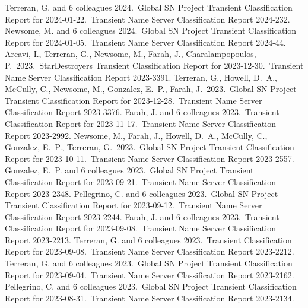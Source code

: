 \documentclass[margin,line]{res}
\begin{document}
\begin{resume}
 Terreran, G. and 6 colleagues 2024.\ Global SN Project Transient Classification Report for 2024-01-22.\ Transient Name Server Classification Report 2024-232.
 Newsome, M. and 6 colleagues 2024.\ Global SN Project Transient Classification Report for 2024-01-05.\ Transient Name Server Classification Report 2024-44.
 Arcavi, I., Terreran, G., Newsome, M., Farah, J., Charalampopoulos, P.\ 2023.\ StarDestroyers Transient Classification Report for 2023-12-30.\ Transient Name Server Classification Report 2023-3391.
 Terreran, G., Howell, D.~A., McCully, C., Newsome, M., Gonzalez, E.~P., Farah, J.\ 2023.\ Global SN Project Transient Classification Report for 2023-12-28.\ Transient Name Server Classification Report 2023-3376.
 Farah, J. and 6 colleagues 2023.\ Transient Classification Report for 2023-11-17.\ Transient Name Server Classification Report 2023-2992.
 Newsome, M., Farah, J., Howell, D.~A., McCully, C., Gonzalez, E.~P., Terreran, G.\ 2023.\ Global SN Project Transient Classification Report for 2023-10-11.\ Transient Name Server Classification Report 2023-2557.
 Gonzalez, E.~P. and 6 colleagues 2023.\ Global SN Project Transient Classification Report for 2023-09-21.\ Transient Name Server Classification Report 2023-2348.
 Pellegrino, C. and 6 colleagues 2023.\ Global SN Project Transient Classification Report for 2023-09-12.\ Transient Name Server Classification Report 2023-2244.
 Farah, J. and 6 colleagues 2023.\ Transient Classification Report for 2023-09-08.\ Transient Name Server Classification Report 2023-2213.
 Terreran, G. and 6 colleagues 2023.\ Transient Classification Report for 2023-09-08.\ Transient Name Server Classification Report 2023-2212.
 Terreran, G. and 6 colleagues 2023.\ Global SN Project Transient Classification Report for 2023-09-04.\ Transient Name Server Classification Report 2023-2162.
 Pellegrino, C. and 6 colleagues 2023.\ Global SN Project Transient Classification Report for 2023-08-31.\ Transient Name Server Classification Report 2023-2134.

\end{resume}
\end{document}
